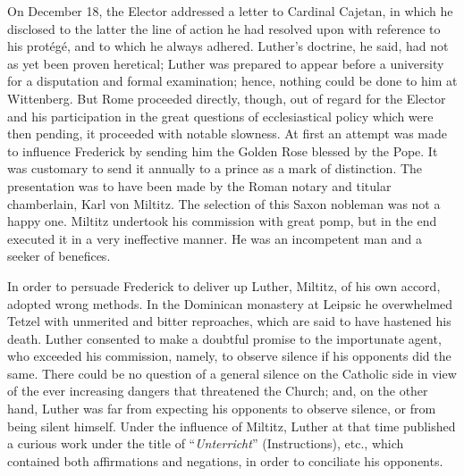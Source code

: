 On December 18, the Elector addressed a letter to Cardinal
Cajetan, in which he disclosed to the latter the line of action he had
resolved upon with reference to his protégé, and to which he
always adhered. Luther’s doctrine, he said, had not as yet been proven
heretical; Luther was prepared to appear before a university for a disputation
and formal examination; hence, nothing could be done to
him at Wittenberg. But Rome proceeded directly, though, out of
regard for the Elector and his participation in the great questions
of ecclesiastical policy which were then pending, it proceeded with
notable slowness. At first an attempt was made to influence Frederick
by sending him the Golden Rose blessed by the Pope. It was customary
to send it annually to a prince as a mark of distinction. The
presentation was to have been made by the Roman notary and titular
chamberlain, Karl von Miltitz. The selection of this Saxon nobleman
was not a happy one. Miltitz undertook his commission with great
pomp, but in the end executed it in a very ineffective manner. He was
an incompetent man and a seeker of benefices.

In order to persuade Frederick to deliver up Luther, Miltitz, of
his own accord, adopted wrong methods. In the Dominican monastery at Leipsic
he overwhelmed Tetzel with unmerited and bitter
reproaches, which are said to have hastened his death. Luther consented
to make a doubtful promise to the importunate agent, who
exceeded his commission, namely, to observe silence if his opponents
did the same. There could be no question of a general silence on the
Catholic side in view of the ever increasing dangers that threatened
the Church; and, on the other hand, Luther was far from expecting
his opponents to observe silence, or from being silent himself. Under
the influence of Miltitz, Luther at that time published a curious work
under the title of “\textit{Unterricht}” (Instructions), etc., which contained
both affirmations and negations, in order to conciliate his opponents.

